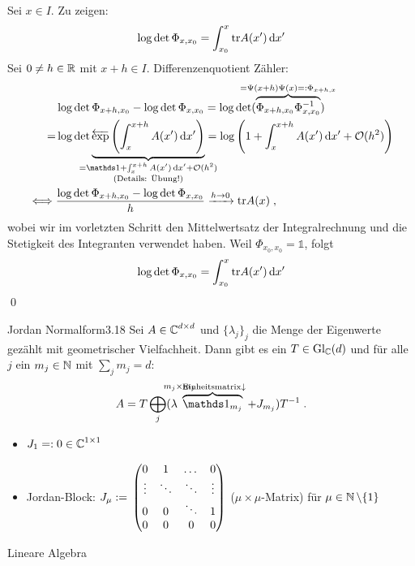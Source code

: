 \documentclass[a4paper]{article}
\begin{document}
\begin{Beweis}
Sei $x\in I$. Zu zeigen:
\[\log\det\Phi_{x,x_0}=\int_{x_0}^x\textrm{tr} A(x')\mathop{}\!\mathrm{d} x'\]
Sei $0\ne h\in\mathbb R$ mit $x+h\in I$. Differenzenquotient Zähler:
\begin{align*}
&\log\det\Phi_{x+h,x_0}-\log\det\Phi_{x,x_0}=\log\det(\overbrace{\Phi_{x+h,x_0}\Phi_{x,x_0}^{-1}}^{\mathclap{=\Psi(x+h)\Psi(x)=:\Phi_{x+h,x}}})\\
=&\log \det \underbrace{\overleftarrow{\exp}\left(\int_{x}^{x+h}A(x')\dd x'\right)}_{\mathclap{\substack{=\mathds1+\int_x^{x+h}A(x')\dd x'+\OO(h^2)\\\text{(Details: Übung!)}}}}
=\log\left(1+\int_x^{x+h}A(x')\dd x'+\OO(h^2)\right)\\
\iff&\frac{\log\det\Phi_{x+h,x_0}-\log\det\Phi_{x,x_0}}{h}\xrightarrow{h\to0}\tr A(x)\;,
\end{align*}
wobei wir im vorletzten Schritt den Mittelwertsatz der Integralrechnung und die Stetigkeit des Integranten verwendet haben.
Weil $\Phi_{x_0,x_0}=\mathds1$, folgt
\[\log\det\Phi_{x,x_0}=\int_{x_0}^x\textrm{tr} A(x')\mathop{}\!\mathrm{d} x'\]
\qed
\end{Beweis}

\begin{Satz}{Jordan Normalform}{3.18}
Sei $A\in\operatorname{\mathbb C}^{d\times d}$ und $\{\lambda_j\}_j$ die Menge der Eigenwerte gezählt mit geometrischer Vielfachheit. Dann gibt es ein $T\in \operatorname{\mathrm{Gl}}_{\operatorname{\mathbb C}}(d)$ und für alle $j$ ein $m_j\in\operatorname{\mathbb N}$ mit $\sum_jm_j=d$:
\[A=T\bigoplus_j(\lambda\overbrace{\mathds1_{m_j}}^{\ms{m_j\times m_j}\te{Einheitsmatrix}\\ \downarrow}+J_{m_j})T^{-1}\;.\]
\begin{itemize}
\item  $J_1=:0\in \operatorname{\mathbb C}^{1\times 1}$
\item Jordan-Block: $J_{\mu}:=\mathop{}\begin{pmatrix}0&1&\dots&0\\\vdots&\ddots&\ddots&\vdots\\
0&0&\ddots&1\\
0&0&0&0
\end{pmatrix}$ ($\mu\times\mu$-Matrix) für $\mu\in\operatorname{\mathbb N}\setminus\{1\}$
\end{itemize}
\end{Satz}

\begin{Beweis}
Lineare Algebra
\end{Beweis}
\end{document}

